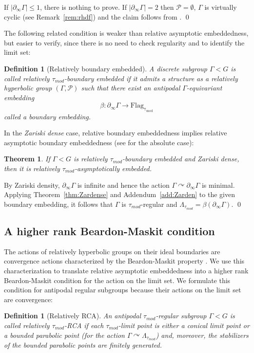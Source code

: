 \documentclass[12pt]{article}
\theoremstyle{boldplain}
\newtheorem{thm}[equation]{Theorem}
\theoremstyle{bolddefinition}
\newtheorem{definition}[equation]{Definition}
\numberwithin{equation}{section}
\def\P{\mathcal P}
\def\Ga{\Gamma}
\def\La{\Lambda}
\def\acts{\curvearrowright}
\def\Flagt{\operatorname{Flag_{\tau_{mod}}}}
\def\geo{\partial_{\infty}}
\def\Lat{\La_{\tau_{mod}}}
\def\lra{\longrightarrow}
\def\taumod{\tau_{mod}}
\begin{document}
If $|\geo \Ga|\le 1$, there is nothing to prove. 
If $|\geo\Ga|=2$ then $\P=\emptyset$, $\Ga$ is virtually cyclic (see Remark~\ref{rem:rhdf}) and the claim follows from 
\cite[Lemma 5.38]{anolec}.  
\qed

\medskip
The following related condition is weaker than relative asymptotic embeddedness, 
but easier to verify, since there is no need to check regularity and to identify the limit set: 
\begin{definition}[Relatively boundary embedded]
\label{def:relboundaryembedded}
A discrete subgroup $\Ga<G$ is called {\em relatively $\taumod$-boundary embedded} 
if it admits a structure as a relatively hyperbolic group $(\Ga,{\mathcal P})$
such that there exist an antipodal $\Ga$-equivariant embedding
$$ \beta:\geo\Ga \lra\Flagt $$
called a {\em boundary embedding}.
\end{definition}


\medskip 
In the {\em Zariski dense} case, relative boundary embeddedness implies relative asymptotic boundary embeddedness 
(see \cite[Corollary 5.14]{anolec} for the absolute case): 

\begin{thm}
\label{thm:BdZarden}
If $\Ga< G$ is relatively $\taumod$-boundary embedded and Zariski dense,
then it is relatively $\taumod$-asymptotically embedded. 
\end{thm} 
\proof By Zariski density, $\geo \Ga$ is infinite and hence the action $\Ga\acts\geo\Ga$ is minimal.
Applying Theorem~\ref{thm:Zardense} and Addendum~\ref{add:Zarden} to the given boundary embedding,
it follows that $\Ga$ is $\taumod$-regular and $\Lat=\beta(\geo\Ga)$.
\qed 


\subsection{A higher rank Beardon-Maskit condition}

The actions of relatively hyperbolic groups on their ideal boundaries are convergence actions characterized by the Beardon-Maskit property
\cite{Yaman}.
We use this characterization to translate relative asymptotic embeddedness into a higher rank Beardon-Maskit condition
for the action on the limit set.
We formulate this condition for antipodal regular subgroups because their actions on the limit set are convergence:

\begin{definition}[Relatively RCA]
\label{dfn:rlrca}
An antipodal $\taumod$-regular subgroup $\Ga< G$ is called {\em relatively $\taumod$-RCA}
if each $\taumod$-limit point is either a conical limit point or a bounded parabolic point (for the action $\Ga\acts\Lat$)
and, moreover, the stabilizers of the bounded parabolic points are finitely generated. 
\end{definition}
\end{document}
